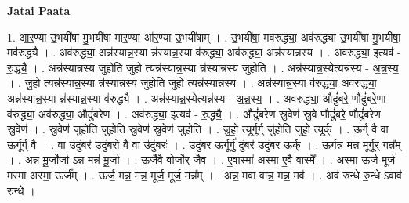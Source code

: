 \documentclass[17pt]{extarticle}
\begin{document}
\textbf{Jatai Paata} \newline

1. आ॒र॒ण्या उ॒भयी॑षा मु॒भयी॑षा मार॒ण्या आ॑र॒ण्या उ॒भयी॑षाम् । . उ॒भयी॑षा॒ मव॑रुद्ध्या॒ अव॑रुद्ध्या उ॒भयी॑षा मु॒भयी॑षा॒ मव॑रुद्ध्यै । . अव॑रुद्ध्या॒ अन्न॑स्यान्न॒स्या न्न॑स्यान्न॒स्या व॑रुद्ध्या॒ अव॑रुद्ध्या॒ अन्न॑स्यान्नस्य । . अव॑रुद्ध्या॒ इत्यव॑ - रु॒द्ध्यै॒ । . अन्न॑स्यान्नस्य जुहोति जुहो॒ त्यन्न॑स्यान्न॒स्या न्न॑स्यान्नस्य जुहोति । . अन्न॑स्यान्न॒स्येत्यन्न॑स्य - अ॒न्न॒स्य॒ । . जु॒हो॒ त्यन्न॑स्यान्न॒स्या न्न॑स्यान्नस्य जुहोति जुहो॒ त्यन्न॑स्यान्नस्य । . अन्न॑स्यान्न॒स्या व॑रुद्ध्या॒ अव॑रुद्ध्या॒ अन्न॑स्यान्न॒स्या न्न॑स्यान्न॒स्या व॑रुद्ध्यै । . अन्न॑स्यान्न॒स्येत्यन्न॑स्य - अ॒न्न॒स्य॒ । . अव॑रुद्ध्या॒ औदुं॑बरे॒ णौदुं॑बरे॒णा व॑रुद्ध्या॒ अव॑रुद्ध्या॒ औदुं॑बरेण । . अव॑रुद्ध्या॒ इत्यव॑ - रु॒द्ध्यै॒ । . औदुं॑बरेण स्रु॒वेण॑ स्रु॒वे णौदुं॑बरे॒ णौदुं॑बरेण स्रु॒वेण॑ । . स्रु॒वेण॑ जुहोति जुहोति स्रु॒वेण॑ स्रु॒वेण॑ जुहोति । . जु॒हो॒ त्यूर्गूर्ग् जु॑होति जुहो॒ त्यूर्क् । . ऊर्ग् वै वा ऊर्गूर्ग् वै । . वा उ॑दुं॒बर॑ उदुं॒बरो॒ वै वा उ॑दुं॒बरः॑ । . उ॒दुं॒बर॒ ऊर्गूर्गु॑ दुं॒बर॑ उदुं॒बर॒ ऊर्क् । . ऊर्गन्न॒ मन्न॒ मूर्गूर् गन्न᳚म् । . अन्न॑ मू॒र्जोर्जा ऽन्न॒ मन्न॑ मू॒र्जा । . ऊ॒र्जैवै वोर्जोर् जैव । . ए॒वास्मा॑ अस्मा ए॒वै वास्मै᳚ । . अ॒स्मा॒ ऊर्ज॒ मूर्ज॑ मस्मा अस्मा॒ ऊर्ज᳚म् । . ऊर्ज॒ मन्न॒ मन्न॒ मूर्ज॒ मूर्ज॒ मन्न᳚म् । . अन्न॒ मवा वान्न॒ मन्न॒ मव॑ । . अव॑ रुन्धे रु॒न्धे ऽवाव॑ रुन्धे । \newline
\end{document}
